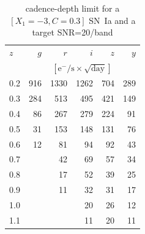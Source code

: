\documentclass[\docopts]{\docclass}
\begin{document}
\begin{table}[t]
\begin{center}
\caption{cadence-depth limit for a $[X_1=-3, C=0.3]$ SN~Ia and a target SNR=20/band}
\label{tab:cadence_depth_limit}
\begin{tabular}{l|rrrrr}
\hline
\hline
    $z$   &      $g$         &       $r$         &     $i$           &      $z$        &      $y$           \\
          &      \multicolumn{5}{c}{$[\mathrm{e^-/s \times \sqrt{day}}]$} \\
\hline
     0.2  &     916 &    1330 &    1262 &     704 &     289   \\
     0.3  &     284 &     513 &     495 &     421 &     149   \\
     0.4  &      86 &     267 &     279 &     224 &      91   \\
     0.5  &      31 &     153 &     148 &     131 &      76   \\
     0.6  &      12 &      81 &      94 &      92 &      43   \\
     0.7  &         &      42 &      69 &      57 &      34   \\
     0.8  &         &      17 &      52 &      39 &      25   \\
     0.9  &         &      11 &      32 &      31 &      17   \\
     1.0  &         &         &      20 &      26 &      12   \\
     1.1  &         &         &      11 &      20 &      11   \\

\hline
\end{tabular}
\end{center}
\end{table}
\end{document}
